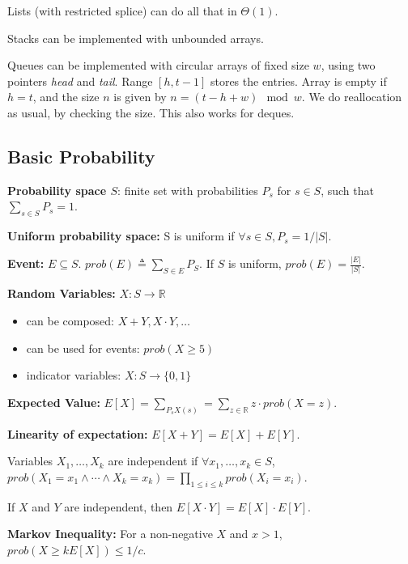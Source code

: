 \noindent Lists (with restricted splice) can do all that in $\Theta(1)$.

\bigskip \noindent Stacks can be implemented with unbounded arrays.

\bigskip \noindent Queues can be implemented with circular arrays of fixed size $w$, using two pointers \emph{head} and \emph{tail}. Range $[h, t-1]$ stores the entries. Array is empty if $h = t$, and the size $n$ is given by $n = (t - h + w) \mod w$. We do reallocation as usual, by checking the size. This also works for deques.

\subsection{Basic Probability}

\textbf{Probability space $S$}: finite set with probabilities $P_s$ for $s \in S$, such that ${\sum_{s \in S} P_s = 1}$.

\noindent \textbf{Uniform probability space:} S is uniform if $\forall s \in S, P_s = 1/|S|$.

\noindent \textbf{Event:} $E \subseteq S$. ${prob}(E) \triangleq \sum_{S \in E} P_S$. If $S$ is uniform, ${prob}(E) = \frac{|E|}{|S|}$.

\noindent \textbf{Random Variables:} $X: S \rightarrow \mathbb{R}$
\begin{itemize}
\item can be composed: $X+Y, X\cdot Y, \ldots$
\item can be used for events: ${prob}(X \ge 5)$
\item indicator variables: $X: S \rightarrow \{0, 1\}$
\end{itemize}

\noindent \textbf{Expected Value:} $E[X] = \sum_{P_s X(s)} = \sum_{z \in \mathbb{R}} z \cdot {prob}(X = z)$.

\noindent \textbf{Linearity of expectation:} $E[X + Y] = E[X] + E[Y]$.

Variables $X_1,\ldots,X_k$ are independent if $\forall x_1,\ldots,x_k \in S$, ${prob}(X_1 = x_1 \wedge \cdots \wedge X_k = x_k) = \prod_{1 \le i \le k} {prob}(X_i = x_i)$.

\bigskip \noindent If $X$ and $Y$ are independent, then $E[X \cdot Y] = E[X] \cdot E[Y]$.

\bigskip \noindent \textbf{Markov Inequality:} For a non-negative $X$ and $x > 1$, ${prob}(X \ge k E[X]) \le 1/c$. 

